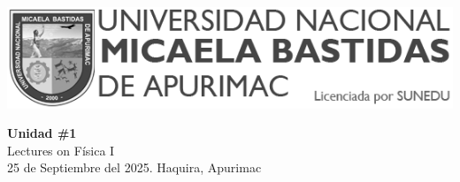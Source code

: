

\begin{minipage}[l]{0.42\textwidth}
    \includegraphics[width=1\textwidth]{img/logo-UNAMBA.png}
\end{minipage}
\hfill
\begin{minipage}[c]{0.5\textwidth}
    \begin{flushright}
	\large{\textbf{Unidad \#1}}\\
	\large{Lectures on Física I}\\
	\large{25 de Septiembre del 2025. Haquira, Apurimac}\\
    \end{flushright}
\end{minipage}


  
